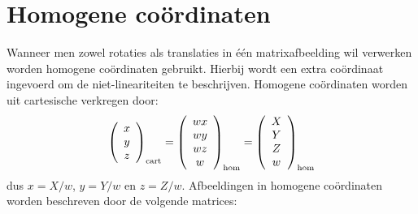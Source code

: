 \documentclass[twoside]{report}
\begin{document}
\section{Homogene co\"ordinaten}
Wanneer men zowel rotaties als translaties in \'e\'en matrixafbeelding wil
verwerken worden homogene co\"ordinaten gebruikt. Hierbij wordt een extra
co\"ordinaat ingevoerd om de niet-lineariteiten te beschrijven. Homogene
co\"ordinaten worden uit cartesische verkregen door:
\[
\left(\begin{array}{c}x\\ y\\ z\end{array}\right)_{\rm cart}=
\left(\begin{array}{c}wx\\ wy\\ wz\\ w\end{array}\right)_{\rm hom}=
\left(\begin{array}{c}X\\ Y\\ Z\\ w\end{array}\right)_{\rm hom}
\]
dus $x=X/w$, $y=Y/w$ en $z=Z/w$. Afbeeldingen in homogene co\"ordinaten
worden beschreven door de volgende matrices:
\end{document}
